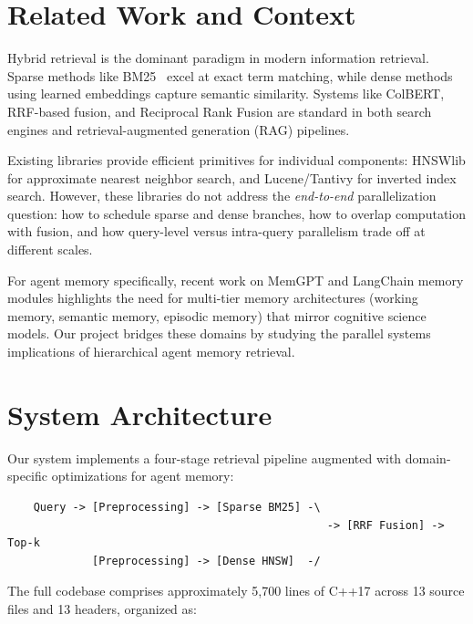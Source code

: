 \documentclass[11pt]{article}
\begin{document}
\section{Related Work and Context}

Hybrid retrieval is the dominant paradigm in modern information retrieval. Sparse methods like BM25~\cite{bm25} excel at exact term matching, while dense methods using learned embeddings capture semantic similarity. Systems like ColBERT, RRF-based fusion, and Reciprocal Rank Fusion are standard in both search engines and retrieval-augmented generation (RAG) pipelines.

Existing libraries provide efficient primitives for individual components: HNSWlib for approximate nearest neighbor search, and Lucene/Tantivy for inverted index search. However, these libraries do not address the \textit{end-to-end} parallelization question: how to schedule sparse and dense branches, how to overlap computation with fusion, and how query-level versus intra-query parallelism trade off at different scales.

For agent memory specifically, recent work on MemGPT and LangChain memory modules highlights the need for multi-tier memory architectures (working memory, semantic memory, episodic memory) that mirror cognitive science models. Our project bridges these domains by studying the parallel systems implications of hierarchical agent memory retrieval.

\section{System Architecture}

Our system implements a four-stage retrieval pipeline augmented with domain-specific optimizations for agent memory:

\begin{verbatim}
    Query -> [Preprocessing] -> [Sparse BM25] -\
                                                 -> [RRF Fusion] -> Top-k
             [Preprocessing] -> [Dense HNSW]  -/
\end{verbatim}

\noindent The full codebase comprises approximately 5,700 lines of C++17 across 13 source files and 13 headers, organized as:
\end{document}
